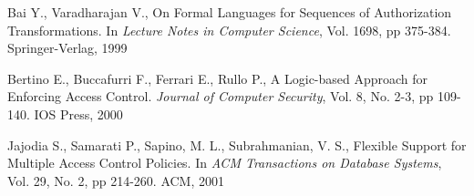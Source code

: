 \documentclass{llncs}
\begin{document}
  \begin{thebibliography}{5}
      Bai Y., Varadharajan V.,
      On Formal Languages for Sequences of Authorization Transformations.
      In \emph{Lecture Notes in Computer Science},
      Vol. 1698,
      pp 375-384.
      Springer-Verlag, 1999

      Bertino E., Buccafurri F., Ferrari E., Rullo P.,
      A Logic-based Approach for Enforcing Access Control.
      \emph{Journal of Computer Security},
      Vol. 8, No. 2-3,
      pp 109-140.
      IOS Press, 2000

      Jajodia S., Samarati P., Sapino, M. L., Subrahmanian, V. S.,
      Flexible Support for Multiple Access Control Policies.
      In \emph{ACM Transactions on Database Systems},
      Vol. 29, No. 2,
      pp 214-260.
      ACM, 2001
  \end{thebibliography}
\end{document}
